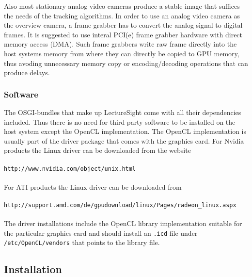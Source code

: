 \documentclass[a4paper,10pt]{book}
\begin{document}
Also most stationary analog video cameras produce a stable image that suffices the needs of the tracking algorithms. In order to use an analog video camera as the overview camera, a frame grabber has to convert the analog signal to digital frames. It is suggested to use interal PCI(e) frame grabber hardware with direct memory access (DMA). Such frame grabbers write raw frame directly into the host systems memory from where they can directly be copied to GPU memory, thus avoding unnecessary memory copy or encoding/decoding operations that can produce delays.

\subsubsection{Software}

The OSGI-bundles that make up LectureSight come with all their dependencies included. Thus there is no need for third-party software to be installed on the host system except the OpenCL implementation. The OpenCL implementation is usually part of the driver package that comes with the graphics card. For Nvidia products the Linux driver can be downloaded from the website
\\~\\
\texttt{http://www.nvidia.com/object/unix.html}
\\~\\
For ATI products the Linux driver can be downloaded from
\\~\\
\texttt{http://support.amd.com/de/gpudownload/linux/Pages/radeon\_linux.aspx}
\\~\\
The driver installations include the OpenCL library implementation suitable for the particular graphics card and should install an \texttt{.icd} file under\\ \texttt{/etc/OpenCL/vendors} that points to the library file.

\subsection{Installation}
\end{document}
